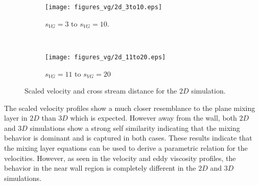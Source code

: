 \begin{figure}[h]
    \centering
    \captionsetup{justification=centering}
    \begin{subfigure}[b]{0.45\textwidth}
    \captionsetup{justification=centering}
        \texttt{[image: figures\_vg/2d\_3to10.eps]}
        \caption{$s_{VG}=3$ to $s_{VG}=10$.}
        \label{fig:scaleclose}
    \end{subfigure}
    ~ %
    \begin{subfigure}[b]{0.45\textwidth}
    \centering
    \captionsetup{justification=centering}
        \texttt{[image: figures\_vg/2d\_11to20.eps]}
        \caption{$s_{VG}=11$ to $s_{VG}=20$}
        \label{fig:scalefar}
    \end{subfigure}
    \caption{Scaled velocity and cross stream distance for the $2D$ simulation.}
    \label{fig:scaledvel}
\end{figure}

The scaled velocity profiles show a much closer resemblance to the plane mixing layer in $2D$ than $3D$ which is expected. However away from the wall, both $2D$ and $3D$ simulations show a strong self similarity indicating that the mixing behavior is dominant and is captured in both cases. These results indicate that the mixing layer equations can be used to derive a parametric relation for the velocities. However, as seen in the velocity and eddy viscosity profiles, the behavior in the near wall region is completely different in the $2D$ and $3D$ simulations.


